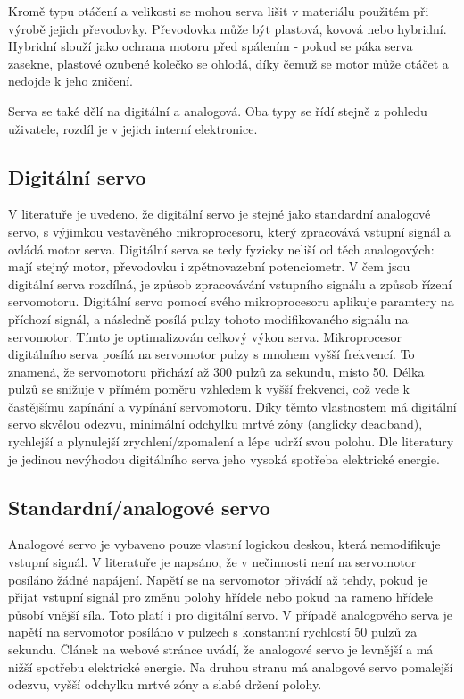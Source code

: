 Kromě typu otáčení a velikosti se mohou serva lišit v materiálu použitém při výrobě jejich převodovky. Převodovka může být plastová, kovová nebo hybridní. Hybridní slouží jako ochrana motoru před spálením - pokud se páka serva zasekne, plastové ozubené kolečko se ohlodá, díky čemuž se motor může otáčet a nedojde k jeho zničení.

Serva se také dělí na digitální a analogová. Oba typy se řídí stejně z pohledu uživatele, rozdíl je v jejich interní elektronice.



\subsection*{Digitální servo}
V literatuře \cite{DigitalServo} je uvedeno, že digitální servo je stejné jako standardní analogové servo, s výjimkou vestavěného mikroprocesoru, který zpracovává vstupní signál a ovládá motor serva. Digitální serva se tedy fyzicky neliší od těch analogových: mají stejný motor, převodovku i zpětnovazební potenciometr. V čem jsou digitální serva rozdílná, je způsob zpracovávání vstupního signálu a způsob řízení servomotoru. Digitální servo pomocí svého mikroprocesoru aplikuje paramtery na příchozí signál, a následně posílá pulzy tohoto modifikovaného signálu na servomotor. Tímto je optimalizován celkový výkon serva. Mikroprocesor digitálního serva posílá na servomotor pulzy s mnohem vyšší frekvencí. To znamená, že servomotoru přichází až 300 pulzů za sekundu, místo 50. Délka pulzů se snižuje v přímém poměru vzhledem k vyšší frekvenci, což vede k častějšímu zapínání a vypínání servomotoru. Díky těmto vlastnostem má digitální servo skvělou odezvu, minimální odchylku mrtvé zóny (anglicky deadband), rychlejší a plynulejší zrychlení/zpomalení a lépe udrží svou polohu. Dle literatury \cite{DigitalServo} je jedinou nevýhodou digitálního serva jeho vysoká spotřeba elektrické energie.

\subsection*{Standardní/analogové servo}
Analogové servo je vybaveno pouze vlastní logickou deskou, která nemodifikuje vstupní signál. V literatuře \cite{DigitalServo} je napsáno, že v nečinnosti není na servomotor posíláno žádné napájení. Napětí se na servomotor přivádí až tehdy, pokud je přijat vstupní signál pro změnu polohy hřídele nebo pokud na rameno hřídele působí vnější síla. Toto platí i pro digitální servo. V případě analogového serva je napětí na servomotor posíláno v pulzech s konstantní rychlostí 50 pulzů za sekundu. Článek na webové stránce \cite{ServoRadioControlInfo} uvádí, že analogové servo je levnější a má nižší spotřebu elektrické energie. Na druhou stranu má analogové servo pomalejší odezvu, vyšší odchylku mrtvé zóny a slabé držení polohy.


